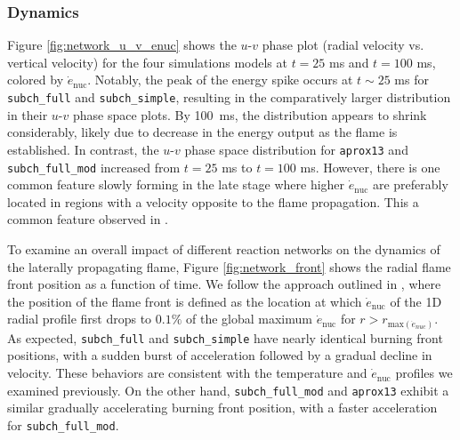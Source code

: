 \documentclass[preprint,times,tighten]{aastex631}
\begin{document}
\subsubsection{Dynamics}

Figure \ref{fig:network_u_v_enuc} shows the $u$-$v$ phase plot (radial velocity vs. vertical velocity) for the four simulations models at $t = 25$ ms and $t = 100$ ms, colored by $\dot{e}_{\textrm{nuc}}$. Notably, the peak of the energy spike occurs at $t \sim 25$ ms for {\tt subch\_full} and {\tt subch\_simple},  resulting in the comparatively larger distribution in their $u$-$v$ phase space plots.  By 100~ms, the distribution appears to shrink considerably, likely due to decrease in the energy output as the flame is
established. In contrast, the $u$-$v$ phase space distribution for {\tt aprox13} and {\tt subch\_full\_mod} increased from $t = 25$ ms to $t = 100$ ms. However, there is one common feature slowly forming in the late stage where higher $\dot{e}_{\textrm{nuc}}$ are preferably located in regions with a velocity opposite to the flame propagation. This a common feature observed in \cite{eiden:2020, harpole:2021}.



\begin{figure*}
\centering
{}
\caption{\label{fig:network_front} Flame front position as a function time for {\tt aprox13}, {\tt subch\_full}, {\tt subch\_full\_mod}, and {\tt subch\_simple}. The results of the fitting function, Eq. \ref{Eq:quadratic_fit} and \ref{Eq:tanh_fit}, is also shown in the dashed lines.}
\end{figure*}

To examine an overall impact of different reaction networks on the dynamics of the laterally propagating flame, Figure \ref{fig:network_front} shows the radial flame front position as a function of time. We follow the approach outlined in \cite{eiden:2020}, where the position of the flame front is defined as the location at which $\dot{e}_{\textrm{nuc}}$ of the 1D radial profile first drops to $0.1\%$ of the global maximum $\dot{e}_{\textrm{nuc}}$ for $r > r_{\mbox{max}(\dot{e}_{nuc})}$. As expected, {\tt subch\_full} and {\tt subch\_simple} have nearly identical burning front positions, with a sudden burst of acceleration followed by a gradual decline in velocity. These behaviors are consistent with the temperature and $\dot{e}_{\textrm{nuc}}$ profiles we examined previously. On the other hand, {\tt subch\_full\_mod} and {\tt aprox13} exhibit a similar gradually accelerating burning front position, with a faster acceleration for {\tt subch\_full\_mod}.
\end{document}
